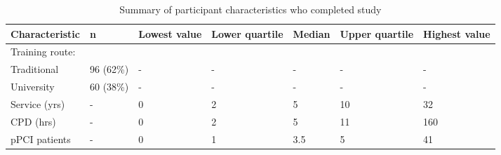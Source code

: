 \begin{table}[htbp]
\centering
\caption{Summary of participant characteristics who completed study} 
\label{partcharfinish}
\begin{tabular}{BKNNNNN}
  \hline
Characteristic & n & Lowest value & Lower quartile & Median & Upper quartile & Highest value \\ 
  \hline
Training route: &   &   &   &   &   &   \\ 
  Traditional & 96 (62\%) & - & - & - & - & - \\ 
  University & 60 (38\%) & - & - & - & - & - \\ 
  Service (yrs) & - & 0 & 2 & 5 & 10 & 32 \\ 
  CPD (hrs) & - & 0 & 2 & 5 & 11 & 160 \\ 
  pPCI patients & - & 0 & 1 & 3.5 & 5 & 41 \\ 
   \hline
\end{tabular}
\end{table}
